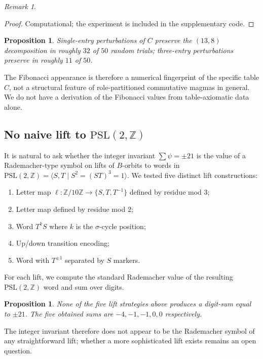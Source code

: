 \documentclass[submission,copyright,creativecommons]{eptcs}
\theoremstyle{plain}
\newtheorem{proposition}[theorem]{Proposition}
\theoremstyle{definition}
\theoremstyle{remark}
\newtheorem{remark}[theorem]{Remark}
\begin{document}
\begin{remark}
\begin{proof}
Computational; the experiment is included in the supplementary code.
\end{proof}

\begin{proposition}
Single-entry perturbations of $C$ preserve the $(13, 8)$ decomposition in
roughly $32$ of $50$ random trials; three-entry perturbations preserve in
roughly $11$ of $50$.
\end{proposition}

The Fibonacci appearance is therefore a numerical fingerprint of the
specific table $C$, not a structural feature of role-partitioned commutative
magmas in general. We do not have a derivation of the Fibonacci values from
table-axiomatic data alone.

\subsection{No naive lift to $\mathrm{PSL}(2, \mathbb{Z})$}

It is natural to ask whether the integer invariant $\sum \psi = \pm 21$ is
the value of a Rademacher-type symbol on lifts of $B$-orbits to words in
$\mathrm{PSL}(2, \mathbb{Z}) = \langle S, T \mid S^2 = (ST)^3 = 1 \rangle$.
We tested five distinct lift constructions:

\begin{enumerate}
\item Letter map $\ell : \mathbb{Z}/10\mathbb{Z} \to \{S, T, T^{-1}\}$
defined by residue mod $3$;
\item Letter map defined by residue mod $2$;
\item Word $T^k S$ where $k$ is the $\sigma$-cycle position;
\item Up/down transition encoding;
\item Word with $T^{\pm 1}$ separated by $S$ markers.
\end{enumerate}

For each lift, we compute the standard Rademacher value of the resulting
$\mathrm{PSL}(2, \mathbb{Z})$ word and sum over digits.

\begin{proposition}
None of the five lift strategies above produces a digit-sum equal to $\pm 21$.
The five obtained sums are $-4, -1, -1, 0, 0$ respectively.
\end{proposition}

The integer invariant therefore does not appear to be the Rademacher
symbol of any straightforward lift; whether a more sophisticated lift
exists remains an open question.


\end{remark}
\end{document}
